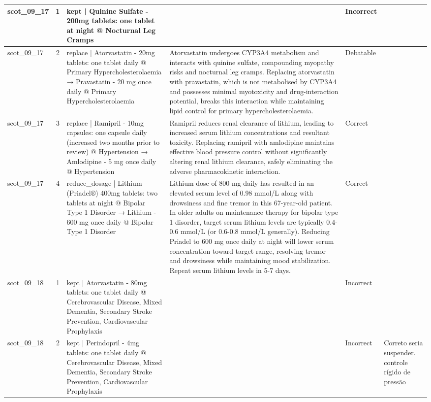 \begin{longtable}{|p{1.45cm}|c|p{3.3cm}|p{6.5cm}|p{1.55cm}|p{2.3cm}|}
\hline
scot\_09\_17 & 1 & kept | Quinine Sulfate - 200mg tablets: one tablet at night @ Nocturnal Leg Cramps &  & Incorrect &  \\
\hline
scot\_09\_17 & 2 & replace | Atorvastatin - 20mg tablets: one tablet daily @ Primary Hypercholesterolaemia → Pravastatin - 20 mg once daily @ Primary Hypercholesterolaemia & Atorvastatin undergoes CYP3A4 metabolism and interacts with quinine sulfate, compounding myopathy risks and nocturnal leg cramps. Replacing atorvastatin with pravastatin, which is not metabolised by CYP3A4 and possesses minimal myotoxicity and drug-interaction potential, breaks this interaction while maintaining lipid control for primary hypercholesterolaemia. & Debatable &  \\
\hline
scot\_09\_17 & 3 & replace | Ramipril - 10mg capsules: one capsule daily (increased two months prior to review) @ Hypertension → Amlodipine - 5 mg once daily @ Hypertension & Ramipril reduces renal clearance of lithium, leading to increased serum lithium concentrations and resultant toxicity. Replacing ramipril with amlodipine maintains effective blood pressure control without significantly altering renal lithium clearance, safely eliminating the adverse pharmacokinetic interaction. & Correct &  \\
\hline
scot\_09\_17 & 4 & reduce\_dosage | Lithium - (Priadel®) 400mg tablets: two tablets at night @ Bipolar Type 1 Disorder → Lithium - 600 mg once daily @ Bipolar Type 1 Disorder & Lithium dose of 800 mg daily has resulted in an elevated serum level of 0.98 mmol/L along with drowsiness and fine tremor in this 67-year-old patient. In older adults on maintenance therapy for bipolar type 1 disorder, target serum lithium levels are typically 0.4-0.6 mmol/L (or 0.6-0.8 mmol/L generally). Reducing Priadel to 600 mg once daily at night will lower serum concentration toward target range, resolving tremor and drowsiness while maintaining mood stabilization. Repeat serum lithium levels in 5-7 days. & Correct &  \\
\hline
scot\_09\_18 & 1 & kept | Atorvastatin - 80mg tablets: one tablet daily @ Cerebrovascular Disease, Mixed Dementia, Secondary Stroke Prevention, Cardiovascular Prophylaxis &  & Incorrect &  \\
\hline
scot\_09\_18 & 2 & kept | Perindopril - 4mg tablets: one tablet daily @ Cerebrovascular Disease, Mixed Dementia, Secondary Stroke Prevention, Cardiovascular Prophylaxis &  & Incorrect & Correto seria suspender. controle rígido de pressão \\

\end{longtable}
